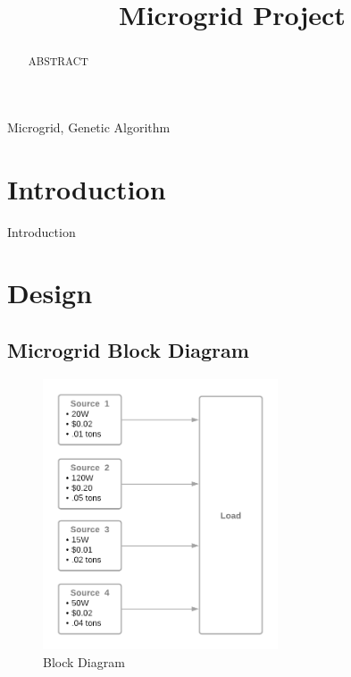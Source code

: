 \documentclass[conference]{IEEEtran}
\begin{document}
\title{Microgrid Project\\}

\author{
}

\maketitle

\begin{abstract}
    ABSTRACT
\end{abstract}

\begin{IEEEkeywords}
Microgrid, Genetic Algorithm
\end{IEEEkeywords}

\section{Introduction}
    Introduction

\section{Design}
    \subsection{Microgrid Block Diagram}
    \begin{figure}[h!]
    \begin{center}
        \includegraphics[height=8cm]{graphics/block_diagram.png}
    \end{center}
    \caption{Block Diagram}
    \label{fig:block}
    \end{figure}
\end{document}
